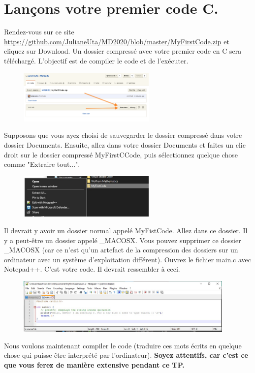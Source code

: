 \documentclass{article}
\begin{document}
\section{Lançons votre premier code C.}
Rendez-vous sur ce site \href{https://github.com/JulianeUta/MD2020/blob/master/MyFirstCode.zip}{https://github.com/JulianeUta/MD2020/blob/master/MyFirstCode.zip} et cliquez sur Download. Un dossier compressé avec votre premier code en C sera téléchargé. L'objectif est de compiler le code et de l'exécuter.
\begin{figure}[H]
\center
\includegraphics[width=0.6\textwidth]{Plots/FirstCode_1.png}
\end{figure}
Supposons que vous ayez choisi de sauvegarder le dossier compressé dans votre dossier Documents. Ensuite, allez dans votre dossier Documents et faites un clic droit sur le dossier compressé MyFirstCCode, puis sélectionnez quelque chose comme "Extraire tout...".
\begin{figure}[H]
\center
\includegraphics[width=0.6\textwidth]{Plots/FirstCode_2.jpg}
\end{figure}
Il devrait y avoir un dossier normal appelé MyFistCode. Allez dans ce dossier. Il y a peut-être un dossier appelé \_MACOSX.  Vous pouvez supprimer ce dossier \_MACOSX (car ce n'est qu'un artefact de la compression des dossiers sur un ordinateur avec un système d'exploitation différent). Ouvrez le fichier main.c avec Notepad++. C'est votre code. Il devrait ressembler à ceci. 
\begin{figure}[H]
\center
\includegraphics[width=0.95\textwidth]{Plots/FirstCode_9.jpeg}
\end{figure}
Nous voulons maintenant compiler le code (traduire ces mots écrits en quelque chose qui puisse être interprété par l'ordinateur). {\color{Bittersweet}\textbf{Soyez attentifs, car c'est ce que vous ferez de manière extensive pendant ce TP.}}
\end{document}
